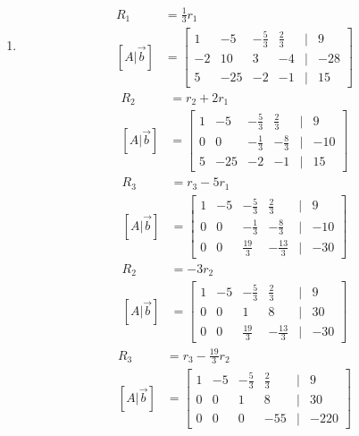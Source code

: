 \documentclass{article}
\begin{document}
\begin{enumerate}[label=\textbf{Set \arabic*}]
	\item
		\begin{align*}
			R_1 & = \frac{1}{3}r_1 \\
			[A|\vec{b}] & = \begin{bmatrix}
				1 & -5 & -\frac{5}{3} & \frac{2}{3} & | & 9 \\
				-2 & 10 & 3 & -4 & | & -28 \\
				5 & -25 & -2 & -1 & | & 15
			\end{bmatrix}
		\end{align*}
		\begin{align*}
			R_2 & = r_2 + 2r_1 \\
			[A|\vec{b}] & = \begin{bmatrix}
				1 & -5 & -\frac{5}{3} & \frac{2}{3} & | & 9 \\
				0 & 0 & -\frac{1}{3} & -\frac{8}{3} & | & -10 \\
				5 & -25 & -2 & -1 & | & 15
			\end{bmatrix}
		\end{align*}
		\begin{align*}
			R_3 & = r_3 - 5r_1 \\
			[A|\vec{b}] & = \begin{bmatrix}
				1 & -5 & -\frac{5}{3} & \frac{2}{3} & | & 9 \\
				0 & 0 & -\frac{1}{3} & -\frac{8}{3} & | & -10 \\
				0 & 0 & \frac{19}{3} & -\frac{13}{3} & | & -30
			\end{bmatrix}
		\end{align*}
		\begin{align*}
			R_2 & = -3r_2 \\
			[A|\vec{b}] & = \begin{bmatrix}
				1 & -5 & -\frac{5}{3} & \frac{2}{3} & | & 9 \\
				0 & 0 & 1 & 8 & | & 30 \\
				0 & 0 & \frac{19}{3} & -\frac{13}{3} & | & -30
			\end{bmatrix}
		\end{align*}
		\begin{align*}
			R_3 & = r_3 - \frac{19}{3}r_2 \\
			[A|\vec{b}] & = \begin{bmatrix}
				1 & -5 & -\frac{5}{3} & \frac{2}{3} & | & 9 \\
				0 & 0 & 1 & 8 & | & 30 \\
				0 & 0 & 0 & -55 & | & -220

\end{bmatrix}
\end{align*}
\end{enumerate}
\end{document}
